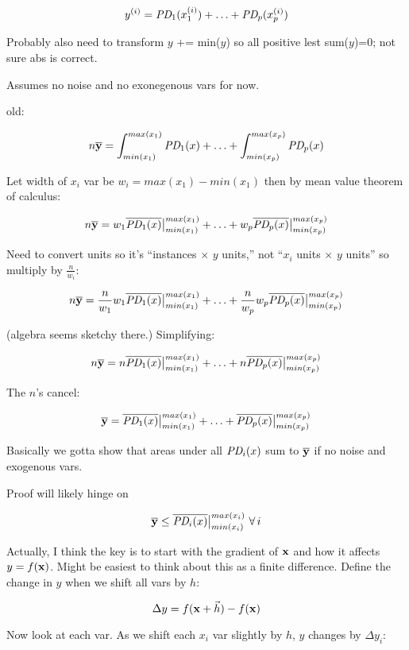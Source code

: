 \documentclass[12pt]{article}
\begin{document}
\[
y^{(i)} = \text{\it PD}_1(x_1^{(i)}) + \ldots + \text{\it PD}_p(x_p^{(i)})
\]

\noindent Probably also need to transform $y$ += min($y$) so all positive lest sum($y$)=0; not sure abs is correct.

Assumes no noise and no exonegenous vars for now.

old:

\[
n \overline {\bf y} = \int_{min(x_1)}^{max(x_1)} \text{\it PD}_1(x) + \ldots + \int_{min(x_p)}^{max(x_p)} \text{\it PD}_p(x)
\]

Let width of $x_i$ var be $w_i = max(x_1)-min(x_1)$ then by mean value theorem of calculus:

\[
n \overline {\bf y} = w_1\overline{\text{\it PD}_1(x)}\big |_{min(x_1)}^{max(x_1)} + \ldots + w_p\overline{\text{\it PD}_p(x)}\big |_{min(x_p)}^{max(x_p)}
\]

Need to convert units so it's ``instances $\times$ $y$ units,'' not ``$x_i$ units $\times$ $y$ units'' so multiply by $\frac{n}{w_i}$:

\[
n \overline {\bf y} = \frac{n}{w_1} w_1\overline{\text{\it PD}_1(x)}\big |_{min(x_1)}^{max(x_1)} + \ldots + \frac{n}{w_p} w_p\overline{\text{\it PD}_p(x)}\big |_{min(x_p)}^{max(x_p)}
\]

(algebra seems sketchy there.) Simplifying:

\[
n \overline {\bf y} = n\overline{\text{\it PD}_1(x)}\big |_{min(x_1)}^{max(x_1)} + \ldots + n \overline{\text{\it PD}_p(x)}\big |_{min(x_p)}^{max(x_p)}
\]

The $n$'s cancel:

\[
\overline {\bf y} = \overline{\text{\it PD}_1(x)}\big |_{min(x_1)}^{max(x_1)} + \ldots + \overline{\text{\it PD}_p(x)}\big |_{min(x_p)}^{max(x_p)}
\]

Basically we gotta show that areas under all $\text{\it PD}_i(x)$ sum to $\overline{\bf y}$ if no noise and exogenous vars.

Proof will likely hinge on

\[
\overline {\bf y} \le \overline{\text{\it PD}_i(x)}\big |_{min(x_i)}^{max(x_i)} ~\forall\, i
\]

Actually, I think the key is to start with the gradient of ${\bf x}$ and how it affects $y=f({\bf x})$. Might be easiest to think about this as a finite difference. Define the change in $y$ when we shift all vars by $h$:

\[
\Delta y = f({\bf x} + \vec{h}) - f({\bf x})
\]

Now look at each var. As we shift each $x_i$ var slightly by $h$, $y$ changes by $\Delta y_i$:
\end{document}
